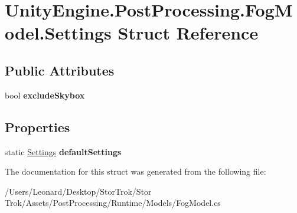 \hypertarget{struct_unity_engine_1_1_post_processing_1_1_fog_model_1_1_settings}{}\section{Unity\+Engine.\+Post\+Processing.\+Fog\+Model.\+Settings Struct Reference}
\label{struct_unity_engine_1_1_post_processing_1_1_fog_model_1_1_settings}
\subsection*{Public Attributes}
\begin{DoxyCompactItemize}
\item 
\mbox{\label{struct_unity_engine_1_1_post_processing_1_1_fog_model_1_1_settings_a7544429209548509f527ae854bd69684}} 
bool {\bfseries exclude\+Skybox}
\end{DoxyCompactItemize}
\subsection*{Properties}
\begin{DoxyCompactItemize}
\item 
\mbox{\label{struct_unity_engine_1_1_post_processing_1_1_fog_model_1_1_settings_a0d0b889397232348949b1b3357cef242}} 
static \hyperlink{struct_unity_engine_1_1_post_processing_1_1_fog_model_1_1_settings}{Settings} {\bfseries default\+Settings}
\end{DoxyCompactItemize}


The documentation for this struct was generated from the following file\+:\begin{DoxyCompactItemize}
\item 
/\+Users/\+Leonard/\+Desktop/\+Stor\+Trok/\+Stor Trok/\+Assets/\+Post\+Processing/\+Runtime/\+Models/Fog\+Model.\+cs\end{DoxyCompactItemize}
